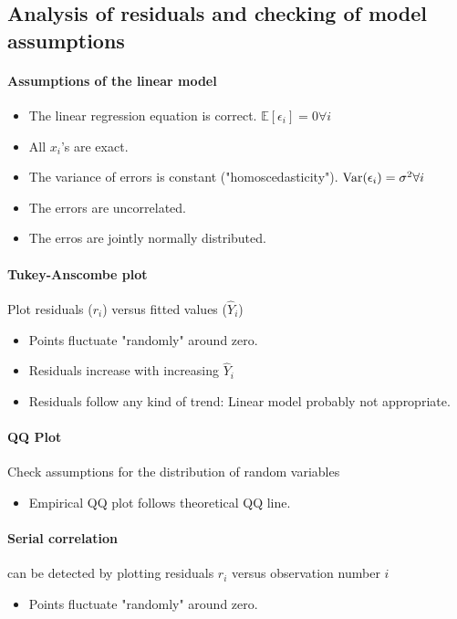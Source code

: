 \subsection{Analysis of residuals and checking of model assumptions}
\begin{theory}
\paragraph{Assumptions of the linear model}
\begin{itemize}
 \item The linear regression equation is correct. $\mathbb{E}[\epsilon_i] = 0 \forall i$
 \item All $x_i$'s are exact.
 \item The variance of errors is constant ("homoscedasticity"). $\operatorname{Var}(\epsilon_i) = \sigma^2 \forall i$
 \item The errors are uncorrelated.
 \item The erros are jointly normally distributed.
\end{itemize}

\paragraph{Tukey-Anscombe plot} Plot residuals ($r_i$) versus fitted values ($\hat{Y}_i$)
\begin{itemize}
 \item[\leftthumbsup] Points fluctuate "randomly" around zero.
 \item[\leftthumbsdown] Residuals increase with increasing $\hat{Y}_i$
 \item[\leftthumbsdown] Residuals follow any kind of trend: Linear model probably not appropriate.
\end{itemize}
\paragraph{QQ Plot} Check assumptions for the distribution of random variables
 \begin{itemize}
  \item[\leftthumbsup] Empirical QQ plot follows theoretical QQ line. 
 \end{itemize}
\paragraph{Serial correlation} can be detected by plotting residuals $r_i$ versus observation number $i$
 \begin{itemize}
  \item[\leftthumbsup] Points fluctuate "randomly" around zero.
 \end{itemize}

\end{theory}
